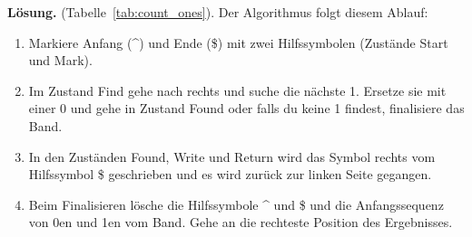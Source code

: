 \textbf{Lösung.} (Tabelle~\ref{tab:count_ones}). Der Algorithmus folgt diesem Ablauf:
\begin{enumerate}
  \item Markiere Anfang (\^{}) und Ende (\$) mit zwei Hilfssymbolen (Zustände Start und Mark).
  \item Im Zustand Find gehe nach rechts und suche die nächste 1.
        Ersetze sie mit einer 0 und gehe in Zustand Found oder falls du keine 1 findest,
        finalisiere das Band.
  \item In den Zuständen Found, Write und Return wird das Symbol rechts vom Hilfssymbol \$
        geschrieben und es wird zurück zur linken Seite gegangen.
  \item Beim Finalisieren lösche die Hilfssymbole \^{} und \$ und die Anfangssequenz von 0en und 1en
        vom Band. Gehe an die rechteste Position des Ergebnisses.
\end{enumerate}
%
